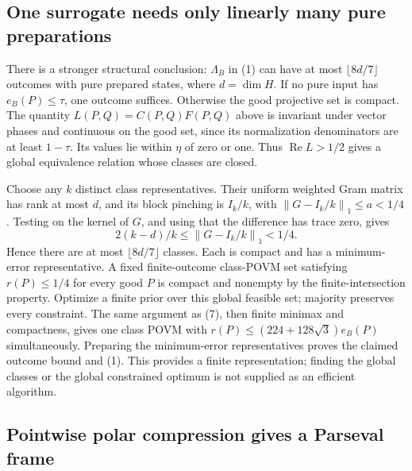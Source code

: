 \documentclass[11pt]{article}
\newcommand{\norm}[1]{\left\lVert#1\right\rVert}
\begin{document}
\subsection{One surrogate needs only linearly many pure preparations}

There is a stronger structural conclusion: $\Lambda_B$ in (1) can have at most $\lfloor8d/7\rfloor$ outcomes with pure prepared states, where $d=\dim H$. If no pure input has $e_B(P)\le\tau$, one outcome suffices. Otherwise the good projective set is compact. The quantity $L(P,Q)=C(P,Q)F(P,Q)$ above is invariant under vector phases and continuous on the good set, since its normalization denominators are at least $1-\tau$. Its values lie within $\eta$ of zero or one. Thus $\operatorname{Re}L>1/2$ gives a global equivalence relation whose classes are closed.

Choose any $k$ distinct class representatives. Their uniform weighted Gram matrix has rank at most $d$, and its block pinching is $I_k/k$, with $\norm{G-I_k/k}_1\le a<1/4$. Testing on the kernel of $G$, and using that the difference has trace zero, gives
\[
2(k-d)/k\le\norm{G-I_k/k}_1<1/4.
\]
Hence there are at most $\lfloor8d/7\rfloor$ classes. Each is compact and has a minimum-error representative. A fixed finite-outcome class-POVM set satisfying $r(P)\le1/4$ for every good $P$ is compact and nonempty by the finite-intersection property. Optimize a finite prior over this global feasible set; majority preserves every constraint. The same argument as (7), then finite minimax and compactness, gives one class POVM with $r(P)\le(224+128\sqrt3)e_B(P)$ simultaneously. Preparing the minimum-error representatives proves the claimed outcome bound and (1). This provides a finite representation; finding the global classes or the global constrained optimum is not supplied as an efficient algorithm.

\subsection{Pointwise polar compression gives a Parseval frame}
\end{document}
